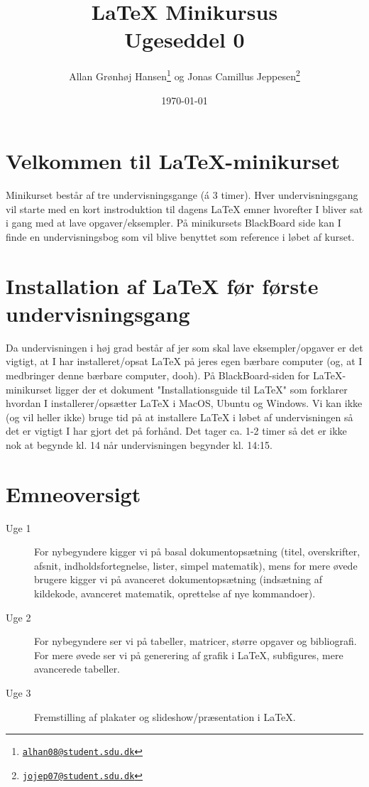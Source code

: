\documentclass[12pt, a4paper]{article}
\title{LaTeX Minikursus\\Ugeseddel 0}
\author{
	Allan Grønhøj Hansen\thanks{\href{mailto:alhan08@student.sdu.dk}{\nolinkurl{alhan08@student.sdu.dk}}}{ }
	og Jonas Camillus Jeppesen\thanks{\href{mailto:jojep07@student.sdu.dk}{\nolinkurl{jojep07@student.sdu.dk}}}
}
\date{\today}
\begin{document}
\maketitle
\thispagestyle{empty}

\section{Velkommen til LaTeX-minikurset}
Minikurset består af tre undervisningsgange (á 3 timer). Hver undervisningsgang vil starte med en kort instroduktion til dagens LaTeX emner hvorefter I bliver sat i gang med at lave opgaver/eksempler. På minikursets BlackBoard side kan I finde en undervisningsbog som vil blive benyttet som reference i løbet af kurset.

\section{Installation af LaTeX før første undervisningsgang}
Da undervisningen i høj grad består af jer som skal lave eksempler/opgaver er det vigtigt, at I har installeret/opsat LaTeX på jeres egen bærbare computer (og, at I medbringer denne bærbare computer, dooh). På BlackBoard-siden for LaTeX-minikurset ligger der et dokument "Installationsguide til LaTeX"{ }som forklarer hvordan I installerer/opsætter LaTeX i MacOS, Ubuntu og Windows. Vi kan ikke (og vil heller ikke) bruge tid på at installere LaTeX i løbet af undervisningen så det er vigtigt I har gjort det på forhånd. Det tager ca. 1-2 timer så det er ikke nok at begynde kl. 14 når undervisningen begynder kl. 14:15.

\section{Emneoversigt}
\begin{description}
\item[Uge 1] For nybegyndere kigger vi på basal dokumentopsætning (titel, overskrifter, afsnit, indholdsfortegnelse, lister, simpel matematik), mens for mere øvede brugere kigger vi på avanceret dokumentopsætning (indsætning af kildekode, avanceret matematik, oprettelse af nye kommandoer). 
\item[Uge 2] For nybegyndere ser vi på tabeller, matricer, større opgaver og bibliografi. For mere øvede ser vi på generering af grafik i LaTeX, subfigures, mere avancerede tabeller.
\item[Uge 3] Fremstilling af plakater og slideshow/præsentation i LaTeX.
\end{description}
\end{document}
